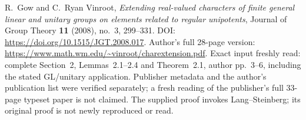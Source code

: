 R.~Gow and C.~Ryan Vinroot,
\emph{Extending real-valued characters of finite general linear and
unitary groups on elements related to regular unipotents},
Journal of Group Theory \textbf{11} (2008), no.~3, 299--331.
DOI: \url{https://doi.org/10.1515/JGT.2008.017}.
Author's full 28-page version:
\url{https://www.math.wm.edu/~vinroot/charextension.pdf}.
Exact input freshly read: complete Section~2, Lemmas~2.1--2.4 and
Theorem~2.1, author pp.~3--6, including the stated GL/unitary
application. Publisher metadata and the author's publication list
were verified separately; a fresh reading of the publisher's full
33-page typeset paper is not claimed. The supplied proof invokes
Lang--Steinberg; its original proof is not newly reproduced or read.


